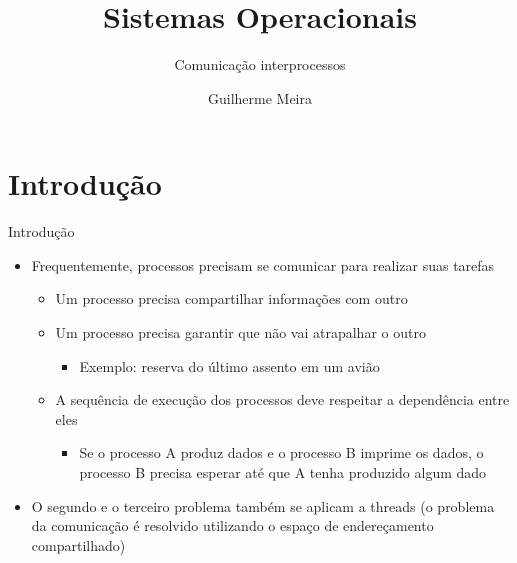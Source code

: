 \documentclass{beamer}
\title{Sistemas Operacionais} %
\subtitle{Comunicação interprocessos} %
\author{Guilherme Meira}
\begin{document}
  \frame{\maketitle}
  	
\section{Introdução}
\begin{frame}{Introdução}
   	\begin{itemize}
   		\item Frequentemente, processos precisam se comunicar para realizar suas tarefas
   		\begin{itemize}
   			\item Um processo precisa compartilhar informações com outro
   			\item Um processo precisa garantir que não vai atrapalhar o outro
   			\begin{itemize}
   				\item Exemplo: reserva do último assento em um avião
   			\end{itemize}
   			\item A sequência de execução dos processos deve respeitar a dependência entre eles
   			\begin{itemize}
   				\item Se o processo A produz dados e o processo B imprime os dados, o processo B precisa esperar até que A tenha produzido algum dado
   			\end{itemize}
   		\end{itemize}
   		\item O segundo e o terceiro problema também se aplicam a threads (o problema da comunicação é resolvido utilizando o espaço de endereçamento compartilhado)
   	\end{itemize}
\end{frame}
\end{document}
